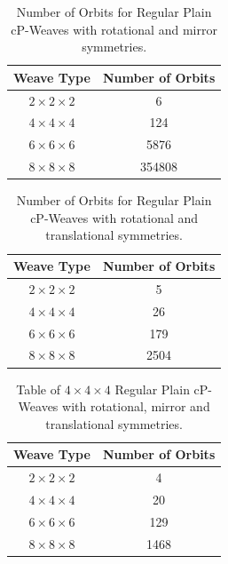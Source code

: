 \documentclass[unnumsec,webpdf,contemporary,large]{oup-authoring-template}%
\theoremstyle{thmstyleone}%
\theoremstyle{thmstyletwo}%
\theoremstyle{thmstylethree}%
\begin{document}
\begin{table}
    \centering
    \caption{Number of Orbits for Regular Plain cP-Weaves with rotational and mirror symmetries.}
    \begin{tabular}{cc}
    \midrule
        Weave Type & Number of Orbits \\\toprule
         $2\times2\times2$ & 6  \\\midrule
         $4\times4\times4$ & 124  \\\midrule
         $6\times6\times6$ & 5876  \\\midrule
         $8\times8\times8$ & 354808  \\\bottomrule
    \end{tabular}
    \label{tab:num2}
\end{table}
\clearpage
\begin{table}
    \centering
    \caption{Number of Orbits for Regular Plain cP-Weaves with rotational and translational symmetries.}
    \begin{tabular}{cc}
    \midrule
        Weave Type & Number of Orbits \\\toprule
         $2\times2\times2$ & 5  \\\midrule
         $4\times4\times4$ & 26  \\\midrule
         $6\times6\times6$ & 179  \\\midrule
         $8\times8\times8$ & 2504  \\\bottomrule
    \end{tabular}
    \label{tab:num3}
\end{table}
\clearpage
\begin{table}
    \centering
    \caption{Table of $4\times4\times4$ Regular Plain cP-Weaves with rotational, mirror and translational symmetries.}
    \begin{tabular}{cc}
    \midrule
        Weave Type & Number of Orbits \\\toprule
         $2\times2\times2$ & 4  \\\midrule
         $4\times4\times4$ & 20  \\\midrule
         $6\times6\times6$ & 129  \\\midrule
         $8\times8\times8$ & 1468  \\\bottomrule
    \end{tabular}
    \label{tab:num4}
\end{table}
\end{document}
